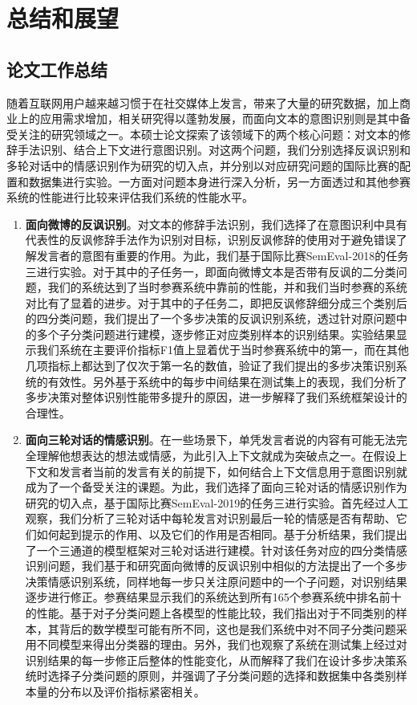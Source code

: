\chapter{总结和展望}
\label{cha:conclusion}

\section{论文工作总结}

随着互联网用户越来越习惯于在社交媒体上发言，带来了大量的研究数据，加上商业上的应用需求增加，相关研究得以蓬勃发展，而面向文本的意图识别则是其中备受关注的研究领域之一。本硕士论文探索了该领域下的两个核心问题：对文本的修辞手法识别、结合上下文进行意图识别。对这两个问题，我们分别选择反讽识别和多轮对话中的情感识别作为研究的切入点，并分别以对应研究问题的国际比赛的配置和数据集进行实验。一方面对问题本身进行深入分析，另一方面透过和其他参赛系统的性能进行比较来评估我们系统的性能水平。

\begin{enumerate}

\item {\bf 面向微博的反讽识别}。对文本的修辞手法识别，我们选择了在意图识利中具有代表性的反讽修辞手法作为识别对目标，识别反讽修辞的使用对于避免错误了解发言者的意图有重要的作用。为此，我们基于国际比赛SemEval-2018的任务三进行实验。对于其中的子任务一，即面向微博文本是否带有反讽的二分类问题，我们的系统达到了当时参赛系统中靠前的性能，并和我们当时参赛的系统对比有了显着的进步。对于其中的子任务二，即把反讽修辞细分成三个类别后的四分类问题，我们提出了一个多步决策的反讽识别系统，透过针对原问题中的多个子分类问题进行建模，逐步修正对应类别样本的识别结果。实验结果显示我们系统在主要评价指标F1值上显着优于当时参赛系统中的第一，而在其他几项指标上都达到了仅次于第一名的数值，验证了我们提出的多步决策识别系统的有效性。另外基于系统中的每步中间结果在测试集上的表现，我们分析了多步决策对整体识别性能带多提升的原因，进一步解释了我们系统框架设计的合理性。

\item {\bf 面向三轮对话的情感识别}。在一些场景下，单凭发言者说的内容有可能无法完全理解他想表达的想法或情感，为此引入上下文就成为突破点之一。在假设上下文和发言者当前的发言有关的前提下，如何结合上下文信息用于意图识别就成为了一个备受关注的课题。为此，我们选择了面向三轮对话的情感识别作为研究的切入点，基于国际比赛SemEval-2019的任务三进行实验。首先经过人工观察，我们分析了三轮对话中每轮发言对识别最后一轮的情感是否有帮助、它们如何起到提示的作用、以及它们的作用是否相同。基于分析结果，我们提出了一个三通道的模型框架对三轮对话进行建模。针对该任务对应的四分类情感识别问题，我们基于和研究面向微博的反讽识别中相似的方法提出了一个多步决策情感识别系统，同样地每一步只关注原问题中的一个子问题，对识别结果逐步进行修正。参赛结果显示我们的系统达到所有165个参赛系统中排名前十的性能。基于对子分类问题上各模型的性能比较，我们指出对于不同类别的样本，其背后的数学模型可能有所不同，这也是我们系统中对不同子分类问题采用不同模型来得出分类器的理由。另外，我们也观察了系统在测试集上经过对识别结果的每一步修正后整体的性能变化，从而解释了我们在设计多步决策系统时选择子分类问题的原则，并强调了子分类问题的选择和数据集中各类别样本量的分布以及评价指标紧密相关。

\end{enumerate}

